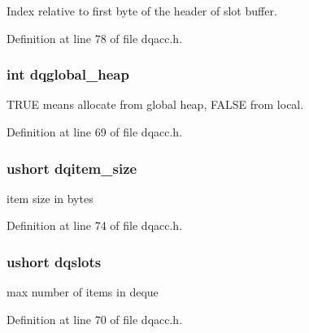 Index relative to first byte of the header of slot buffer. 



Definition at line 78 of file dqacc.\-h.

\hypertarget{struct_d_q_h_e_a_d_e_r_a4d188b9298c3ffeab961c5bec1a4bbf5}{
\subsubsection[{dqglobal\-\_\-heap}]{\setlength{\rightskip}{0pt plus 5cm}int dqglobal\-\_\-heap}}\label{struct_d_q_h_e_a_d_e_r_a4d188b9298c3ffeab961c5bec1a4bbf5}


T\-R\-U\-E means allocate from global heap, F\-A\-L\-S\-E from local. 



Definition at line 69 of file dqacc.\-h.

\hypertarget{struct_d_q_h_e_a_d_e_r_a40241a744320a331e0a0c37ecc1a7b8b}{
\subsubsection[{dqitem\-\_\-size}]{\setlength{\rightskip}{0pt plus 5cm}ushort dqitem\-\_\-size}}\label{struct_d_q_h_e_a_d_e_r_a40241a744320a331e0a0c37ecc1a7b8b}


item size in bytes 



Definition at line 74 of file dqacc.\-h.

\hypertarget{struct_d_q_h_e_a_d_e_r_a569a481b9cdc53a7e96804a51643e504}{
\subsubsection[{dqslots}]{\setlength{\rightskip}{0pt plus 5cm}ushort dqslots}}\label{struct_d_q_h_e_a_d_e_r_a569a481b9cdc53a7e96804a51643e504}


max number of items in deque 



Definition at line 70 of file dqacc.\-h.

